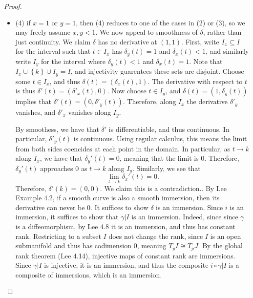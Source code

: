 \documentclass[11pt, letterpaper]{article}
\theoremstyle{plain}
\begin{document}
\begin{proof}
\begin{itemize}
			Now assume that $y,y'<1$. This is slightly easier, since there is $d$ with $y,y'<d<1$. Since the path $\delta $ starts by going up $y\to 1$, it crosses $d$ by the intermediate value theorem. Since it then goes down $1\to y'$, it must cross $d$ again. By continuity of $\delta $ and the definition of what we mean by ``going up and then coming back down'' (which can be proven with a similar continuity argument to the above), the two $t,t'\in I$ such that $\delta_y(t),\delta _y(t')=d$ are \emph{distinct}. This contradicts injectivity.
		\item (4) if $x=1$ or $y=1$, then (4) reduces to one of the cases in (2) or (3), so we may freely assume $x,y<1$. We now appeal to smoothness of $\delta $, rather than just continuity. We claim $\delta $ has no derivative at $(1,1)$. First, write $I_x\subseteq I$ for the interval such that $t\in I_x$ has $\delta _y(t)=1$ and $\delta _x(t)<1$, and similarly write $I_y$ for the interval where $\delta _y(t)<1$ and $\delta _x(t)=1$. Note that $I_x \cup \left\{ k \right\} \cup I_y=I$, and injectivity guarentees these sets are disjoint. Choose some $t\in I_x$, and thus $\delta (t)=(\delta _x(t),1)$. The derivative with respect to $t$ is thus $\delta '(t)=(\delta '_x(t),0)$. Now choose $t\in I_y$, and $\delta (t)=(1,\delta _y(t))$ implies that $\delta '(t)=(0,\delta '_y(t))$. Therefore, along $I_x$ the derivative $\delta'_y$ vanishes, and $\delta '_x$ vanishes along $I_y$.

			By smoothess, we have that $\delta '$ is differentiable, and thus continuous. In particular, $\delta'_y(t)$ is continuous. Using regular calculus, this means the limit from both sides coencides at each point in the domain. In particular, as $t\to k$ along $I_x$, we have that $\delta_y'(t)=0$, meaning that the limit is 0. Therefore, $\delta _y'(t)$ approaches 0 as $t\to k$ along $I_y$. Similarly, we see that
			\[
				\lim_{t \to k} \delta_x'(t)=0
			.\]
			Therefore, $\delta '(k)=(0,0)$. We claim this is a contradiction.. By Lee Example 4.2, if a smooth curve is also a smooth immersion, then its derivative can never be 0. It suffices to show $\delta $ is an immersion. Since $i$ is an immersion, it suffices to show that $\gamma |I$ is an immersion. Indeed, since since $\gamma $ is a diffeomorphism, by Lee 4.8 it is an immersion, and thus has constant rank. Restricting to a subset $I$ does not change the rank, since $I$ is an open submanifold and thus has codimension 0, meaning $T_pI \cong T_pJ$. By the global rank theorem (Lee 4.14), injective maps of constant rank are immersions. Since $\gamma |I$ is injective, it is an immersion, and thus the composite $i\circ \gamma |I$ is a composite of immersions, which is an immersion.
	\end{itemize}
\end{proof}
\end{document}
